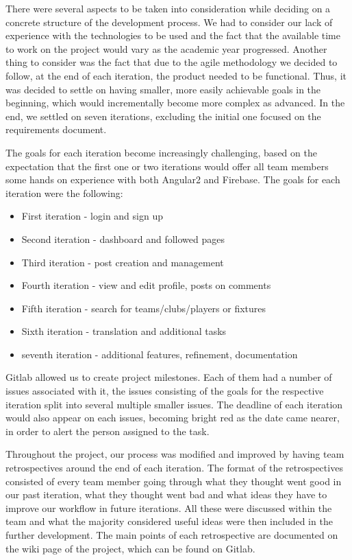 \documentclass{l3proj}
\begin{document}
There were several aspects to be taken into consideration while deciding
 on a concrete structure of the development process. We had to consider
 our lack of experience with the technologies to be used and the fact
 that the available time to work on the project would vary as the academic
 year progressed. Another thing to consider was the fact that due to the
 agile methodology we decided to follow, at the end of each iteration, the
 product needed to be functional. Thus, it was decided to settle on having
 smaller, more easily achievable goals in the beginning, which would
 incrementally become more complex as advanced. In the end, we settled
 on seven iterations, excluding the initial one focused on the requirements
 document.

The goals for each iteration become increasingly challenging, based on the
 expectation that the first one or two iterations would offer all team
 members some hands on experience with both Angular2 and Firebase. The
 goals for each iteration were the following: 
\begin{itemize}
\item First iteration - login and sign up
\item Second iteration - dashboard and followed pages
\item Third iteration - post creation and management
\item Fourth iteration - view and edit profile, posts on comments
\item Fifth iteration - search for teams/clubs/players or fixtures
\item Sixth iteration - translation and additional tasks
\item seventh iteration - additional features, refinement, documentation
\end{itemize} 



Gitlab allowed us to create project milestones. Each of them had a number
 of issues associated with it, the issues consisting of the goals for the
 respective iteration split into several multiple smaller issues. The deadline
 of each iteration would also appear on each issues, becoming bright red as the
 date came nearer, in order to alert the person assigned to the task.

Throughout the project, our process was modified and improved by having team
 retrospectives around the end of each iteration. The format of the retrospectives
 consisted of every team member going through what they thought went good in
 our past iteration, what they thought went bad and what ideas they have to
 improve our workflow in future iterations. All these were discussed within
 the team and what the majority considered useful ideas were then included
 in the further development. The main points of each retrospective are
 documented on the wiki page of the project, which can be found on Gitlab.
\end{document}

